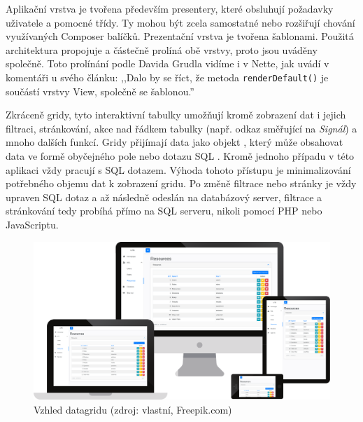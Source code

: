 Aplikační vrstva je tvořena především presentery, které obsluhují požadavky uživatele a pomocné třídy.  Ty mohou být zcela samostatné nebo rozšiřují chování využívaných Composer balíčků. Prezentační vrstva je tvořena šablonami. Použitá architektura propojuje a částečně prolíná obě vrstvy, proto jsou uváděny společně. Toto prolínání podle Davida Grudla vidíme i v Nette, jak uvádí v komentáři u svého článku: ,,Dalo by se říct, že metoda \texttt{renderDefault()} je součástí vrstvy View, společně se šablonou.'' \cite{NetteRefactoring}






\clearpage
{}

 \label{section:Datagridy}
Zkráceně gridy, tyto interaktivní tabulky umožňují kromě zobrazení dat i jejich filtraci, stránkování, akce nad řádkem tabulky (např. odkaz směřující na \textit{Signál}) a mnoho dalších funkcí. Gridy přijímají data jako objekt , který může obsahovat data ve formě obyčejného pole nebo dotazu SQL \cite{ContributteDataGrid}. Kromě jednoho případu v této aplikaci vždy pracují s SQL dotazem. Výhoda tohoto přístupu je minimalizování potřebného objemu dat k zobrazení gridu. Po změně filtrace nebo stránky je vždy upraven SQL dotaz a až následně odeslán na databázový server, filtrace a stránkování tedy probíhá přímo na SQL serveru, nikoli pomocí PHP nebo JavaScriptu.

\begin{figure}[h]
	\centering
	\includegraphics[width=\linewidth]{svg/mockup/datagrid.eps}
	\captionsetup{width=\linewidth}
	\caption[Vzhled datagridu]{Vzhled datagridu (zdroj: vlastní, Freepik.com)}
	\label{mockup:login}
\end{figure}

